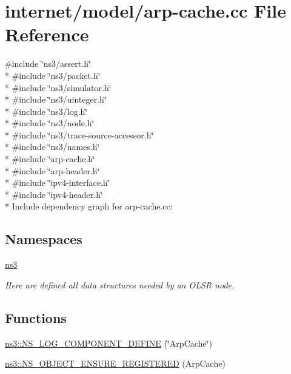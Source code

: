 \hypertarget{arp-cache_8cc}{}\section{internet/model/arp-\/cache.cc File Reference}
\label{arp-cache_8cc}
{\ttfamily \#include \char`\"{}ns3/assert.\+h\char`\"{}}\\*
{\ttfamily \#include \char`\"{}ns3/packet.\+h\char`\"{}}\\*
{\ttfamily \#include \char`\"{}ns3/simulator.\+h\char`\"{}}\\*
{\ttfamily \#include \char`\"{}ns3/uinteger.\+h\char`\"{}}\\*
{\ttfamily \#include \char`\"{}ns3/log.\+h\char`\"{}}\\*
{\ttfamily \#include \char`\"{}ns3/node.\+h\char`\"{}}\\*
{\ttfamily \#include \char`\"{}ns3/trace-\/source-\/accessor.\+h\char`\"{}}\\*
{\ttfamily \#include \char`\"{}ns3/names.\+h\char`\"{}}\\*
{\ttfamily \#include \char`\"{}arp-\/cache.\+h\char`\"{}}\\*
{\ttfamily \#include \char`\"{}arp-\/header.\+h\char`\"{}}\\*
{\ttfamily \#include \char`\"{}ipv4-\/interface.\+h\char`\"{}}\\*
{\ttfamily \#include \char`\"{}ipv4-\/header.\+h\char`\"{}}\\*
Include dependency graph for arp-\/cache.cc\+:
\subsection*{Namespaces}
\begin{DoxyCompactItemize}
\item 
 \hyperlink{namespacens3}{ns3}
\begin{DoxyCompactList}\small\item\em Here are defined all data structures needed by an O\+L\+SR node. \end{DoxyCompactList}\end{DoxyCompactItemize}
\subsection*{Functions}
\begin{DoxyCompactItemize}
\item 
\hyperlink{namespacens3_a68487092905559bcc8f5d4ac92d01a22}{ns3\+::\+N\+S\+\_\+\+L\+O\+G\+\_\+\+C\+O\+M\+P\+O\+N\+E\+N\+T\+\_\+\+D\+E\+F\+I\+NE} (\char`\"{}Arp\+Cache\char`\"{})
\item 
\hyperlink{namespacens3_aadb98f171bfac2d1cb8568b38baa1322}{ns3\+::\+N\+S\+\_\+\+O\+B\+J\+E\+C\+T\+\_\+\+E\+N\+S\+U\+R\+E\+\_\+\+R\+E\+G\+I\+S\+T\+E\+R\+ED} (Arp\+Cache)
\end{DoxyCompactItemize}
